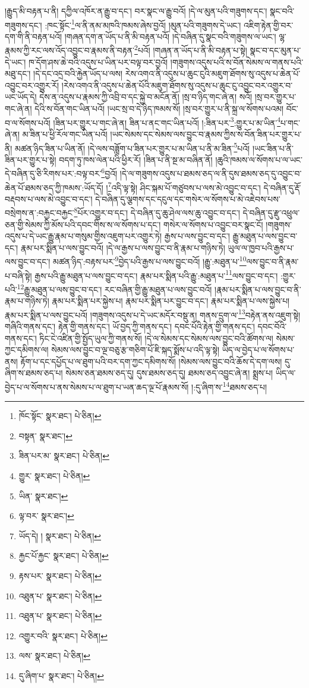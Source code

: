 །རྒྱུད་མི་བརྟན་པ་ནི། དཀྱིལ་འཁོར་ན་རྒྱུ་བ་དང་། བར་སྣང་ལ་རྒྱུ་བའོ། །དེ་ལ་མུན་པའི་གཟུགས་དང་། སྣང་བའི་གཟུགས་དང་། :ཁང་སྟོང་\footnote{ཁོང་སྟོང་  སྣར་ཐང་།  པེ་ཅིན། }ལ་ནི་ནམ་མཁའི་ཁམས་ཞེས་བྱའོ། །མུན་པའི་གཟུགས་དེ་ཡང་། འཇིག་རྟེན་གྱི་བར་དག་གི་ནི་བརྟན་པའོ། །གཞན་དག་ན་ཡོད་པ་ནི་མི་བརྟན་པའོ། །དེ་བཞིན་དུ་སྣང་བའི་གཟུགས་ལ་ཡང་། ལྷ་རྣམས་ཀྱི་རང་ལས་འོད་འབྱུང་བ་རྣམས་ནི་བརྟན་\footnote{བསྟན་  སྣར་ཐང་། }པའོ། །གཞན་ན་ཡོད་པ་ནི་མི་བརྟན་པ་སྟེ། སྣང་བ་དང་མུན་པ་དེ་ཡང་། ཁ་དོག་ཤས་ཆེ་བའི་འདུས་པ་ཡིན་པར་བལྟ་བར་བྱའོ། །གཟུགས་འདུས་པའི་ས་བོན་སེམས་ལ་གནས་པའི་མཐུ་དང་། །དེ་དང་འདྲ་བའི་རྐྱེན་ཡོད་པ་ལས། རེས་འགའ་ནི་འདུས་པ་ཆུང་ངུའི་མཇུག་ཐོགས་སུ་འདུས་པ་ཆེན་པོ་འབྱུང་བར་འགྱུར་རོ། །རེས་འགའ་ནི་འདུས་པ་ཆེན་པོའི་མཇུག་ཐོགས་སུ་འདུས་པ་ཆུང་ངུ་འབྱུང་བར་འགྱུར་བ་ཡང་ཡོད་དེ། དེས་ན་འདུས་པ་རྣམས་ཀྱི་འབྲི་བ་དང་སྐྱེ་བ་མངོན་ནོ། །སྲ་བ་ཉིད་གང་ཞེ་ན། སའོ། །སྲ་བར་གྱུར་པ་གང་ཞེ་ན། དེའི་ས་བོན་གང་ཡིན་པའོ། །ཡང་སྲ་བ་དེ་ཉིད་ཁམས་སོ། །སྲ་བར་གྱུར་པ་ནི་སྐྲ་ལ་སོགས་པའམ། བོང་བ་ལ་སོགས་པའོ། །ཟིན་པར་གྱུར་པ་གང་ཞེ་ན། ཟིན་པ་ནང་གང་ཡིན་པའོ། །:ཟིན་པར་\footnote{ཟིན་པར་མ་  སྣར་ཐང་།  པེ་ཅིན། }:གྱུར་པ་མ་ཡིན་\footnote{གྱུར་  སྣར་ཐང་།  པེ་ཅིན། }པ་གང་ཞེ་ན། མ་ཟིན་པ་ཕྱི་རོལ་གང་ཡིན་པའོ། །ཡང་སེམས་དང་སེམས་ལས་བྱུང་བ་རྣམས་ཀྱིས་ས་བོན་ཟིན་པར་གྱུར་པ་ནི། མཚན་ཉིད་ཟིན་པ་ཡིན་ནོ། །དེ་ལས་བཟློག་པ་ཟིན་པར་གྱུར་པ་མ་ཡིན་པ་ནི་མ་ཟིན་\footnote{ཡིན་  སྣར་ཐང་། }པའོ། །ཡང་ཟིན་པ་ནི་ཟིན་པར་གྱུར་པ་སྟེ། བདག་ཏུ་ཁས་ལེན་པའི་ཕྱིར་རོ། །ཟིན་པ་ནི་སྔ་མ་བཞིན་ནོ། །ཆུའི་ཁམས་ལ་སོགས་པ་ལ་ཡང་དེ་བཞིན་དུ་ཅི་རིགས་པར་:བལྟ་བར་\footnote{ལྟ་བར་  སྣར་ཐང་། }བྱའོ། །དེ་ལ་གཟུགས་འདུས་པ་ཐམས་ཅད་ལ་ནི་དུས་ཐམས་ཅད་དུ་འབྱུང་བ་ཆེན་པོ་ཐམས་ཅད་ཀྱི་ཁམས་:ཡོད་དོ། །\footnote{ཡོད་དེ། །  སྣར་ཐང་།  པེ་ཅིན། }འདི་ལྟ་སྟེ། ཤིང་སྐམ་པོ་གཙུབས་པ་ལས་མེ་འབྱུང་བ་དང་། དེ་བཞིན་དུ་རྡོ་བརྡབས་པ་ལས་མེ་འབྱུང་བ་དང་། དེ་བཞིན་དུ་ལྕགས་དང་དངུལ་དང་གསེར་ལ་སོགས་པ་མེ་འཇེབས་པས་བསྲེགས་ན་:བརྐྱང་བརྐྱང་\footnote{རྐྱང་པོ་རྐྱང་  སྣར་ཐང་།  པེ་ཅིན། }པོར་འགྱུར་བ་དང་། དེ་བཞིན་དུ་ཆུ་ཤེལ་ལས་ཆུ་འབྱུང་བ་དང་། དེ་བཞིན་དུ་རྫུ་འཕྲུལ་ཅན་གྱི་སེམས་ཀྱི་མོས་པའི་དབང་གིས་ས་ལ་སོགས་པ་དང་། གསེར་ལ་སོགས་པ་འབྱུང་བར་སྣང་ངོ། །གཟུགས་འདུས་པ་དེ་ཡང་རྒྱུ་རྣམ་པ་གསུམ་གྱིས་འཇུག་པར་འགྱུར་ཏེ། རྒྱས་པ་ལས་བྱུང་བ་དང་། རྒྱུ་མཐུན་པ་ལས་བྱུང་བ་དང་། རྣམ་པར་སྨིན་པ་ལས་བྱུང་བའོ། །དེ་ལ་རྒྱས་པ་ལས་བྱུང་བ་ནི་རྣམ་པ་གཉིས་ཏེ། ཡུལ་ལ་ཁྱབ་པའི་རྒྱས་པ་ལས་བྱུང་བ་དང་། མཚན་ཉིད་:བརྟས་པར་\footnote{རྟས་པར་  སྣར་ཐང་།  པེ་ཅིན། }བྱེད་པའི་རྒྱས་པ་ལས་བྱུང་བའོ། །རྒྱུ་:མཐུན་པ་\footnote{འཐུན་པ་  སྣར་ཐང་།  པེ་ཅིན། }ལས་བྱུང་བ་ནི་རྣམ་པ་བཞི་སྟེ། རྒྱས་པའི་རྒྱུ་མཐུན་པ་ལས་བྱུང་བ་དང་། རྣམ་པར་སྨིན་པའི་རྒྱུ་:མཐུན་པ་\footnote{འཐུན་པ་  སྣར་ཐང་།  པེ་ཅིན། }ལས་བྱུང་བ་དང་། :གྱུར་པའི་\footnote{འགྱུར་བའི་  སྣར་ཐང་།  པེ་ཅིན། }རྒྱུ་མཐུན་པ་ལས་བྱུང་བ་དང་། རང་བཞིན་གྱི་རྒྱུ་མཐུན་པ་ལས་བྱུང་བའོ། །རྣམ་པར་སྨིན་པ་ལས་བྱུང་བ་ནི་རྣམ་པ་གཉིས་ཏེ། རྣམ་པར་སྨིན་པར་སྐྱེས་པ། རྣམ་པར་སྨིན་པར་བྱུང་བ་དང་། རྣམ་པར་སྨིན་པ་ལས་སྐྱེས་པ། རྣམ་པར་སྨིན་པ་ལས་བྱུང་པའོ། །གཟུགས་འདུས་པ་དེ་ཡང་མདོར་བསྡུ་ན། གནས་དྲུག་ལ་\footnote{ལས་  སྣར་ཐང་།  པེ་ཅིན། }བརྟེན་ནས་འཇུག་སྟེ། གཞིའི་གནས་དང་། རྟེན་གྱི་གནས་དང་། ཡོ་བྱད་ཀྱི་གནས་དང་། དབང་པོའི་རྟེན་གྱི་གནས་དང་། དབང་བོའི་གནས་དང་། ཏིང་ངེ་འཛིན་གྱི་སྤྱོད་ཡུལ་ཀྱི་གནས་སོ། །དེ་ལ་སེམས་དང་སེམས་ལས་བྱུང་བའི་ཚོགས་ལ། སེམས་ཀྱང་དམིགས་ལ། སེམས་ལས་བྱུང་བ་ལྔ་བཅུ་རྩ་གཅིག་པོ་ཇི་སྐད་སྨོས་པ་འདི་ལྟ་སྟེ། ཡིད་ལ་བྱེད་པ་ལ་སོགས་པ་ནས། རྟོག་པ་དང་དཔྱོད་པ་ལ་ཐུག་པའི་བར་དག་ཀྱང་དམིགས་སོ། །སེམས་ལས་བྱུང་བའི་ཆོས་དེ་དག་ལས། དུ་ཞིག་ས་ཐམས་ཅད་པ། སེམས་ཅན་ཐམས་ཅད་དུ། དུས་ཐམས་ཅད་དུ། ཐམས་ཅད་འབྱུང་ཞེ་ན། སྨྲས་པ། ཡིད་ལ་བྱེད་པ་ལ་སོགས་པ་ནས་སེམས་པ་ལ་ཐུག་པ་ཡན་ཆད་ལྔ་པོ་རྣམས་སོ། །:དུ་ཞིག་ས་\footnote{དུ་ཞིག་པ་  སྣར་ཐང་།  པེ་ཅིན། }ཐམས་ཅད་པ། 